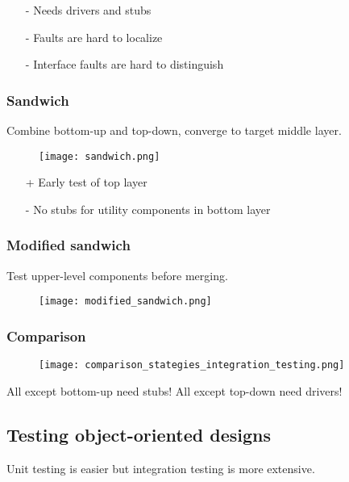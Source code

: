 \begin{itemize}
    \item[-] Needs drivers and stubs
    \item[-] Faults are hard to localize
    \item[-] Interface faults are hard to distinguish
\end{itemize}

\subsubsection{Sandwich}
Combine bottom-up and top-down, converge to target middle layer.

\begin{figure}[!ht]
    \centering
    \texttt{[image: sandwich.png]}
\end{figure}

\begin{itemize}
    \item[+] Early test of top layer
    \item[-] No stubs for utility components in bottom layer
\end{itemize}

\subsubsection{Modified sandwich}
Test upper-level components before merging.

\begin{figure}[!ht]
    \centering
    \texttt{[image: modified\_sandwich.png]}
\end{figure}

\subsubsection{Comparison}

\begin{figure}[!ht]
    \centering
    \texttt{[image: comparison\_stategies\_integration\_testing.png]}
\end{figure}

All except bottom-up need stubs!
All except top-down need drivers!

\subsection{Testing object-oriented designs}
Unit testing is easier but integration testing is more extensive. \newline

